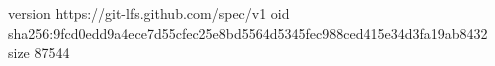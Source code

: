 version https://git-lfs.github.com/spec/v1
oid sha256:9fcd0edd9a4ece7d55cfec25e8bd5564d5345fec988ced415e34d3fa19ab8432
size 87544
